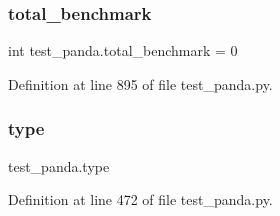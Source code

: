 \subsubsection{\texorpdfstring{total\+\_\+benchmark}{total\_benchmark}}
{\footnotesize\ttfamily int test\+\_\+panda.\+total\+\_\+benchmark = 0}



Definition at line 895 of file test\+\_\+panda.\+py.

\mbox{\label{namespacetest__panda_ad251691de7e6ced00a5792a406f11098}} 
\subsubsection{\texorpdfstring{type}{type}}
{\footnotesize\ttfamily test\+\_\+panda.\+type}



Definition at line 472 of file test\+\_\+panda.\+py.




